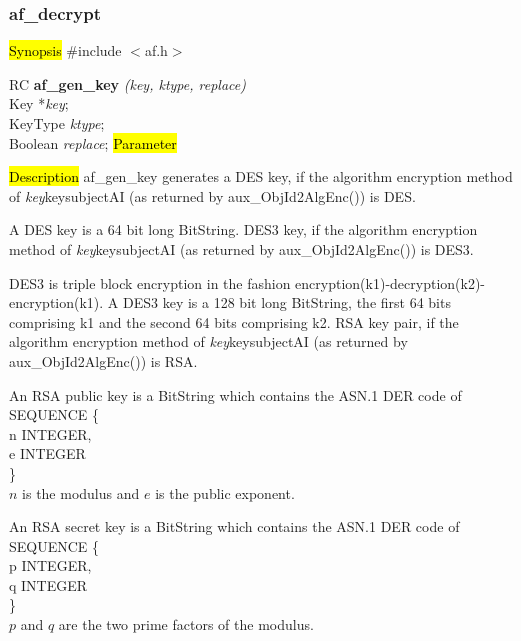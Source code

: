 \subsubsection{af\_decrypt}
\label{af_gen_key}
\hl{Synopsis}
\#include $<$af.h$>$

RC {\bf af\_gen\_key} {\em (key, ktype, replace)} \\
Key *{\em key}; \\
KeyType {\em ktype}; \\
Boolean {\em replace};
\hl{Parameter}



\hl{Description}
af\_gen\_key generates a
\bi
\m  DES key, 
    if the algorithm encryption method 
    of {\em key}\pf key\pf subjectAI (as returned by aux\_ObjId2AlgEnc()) is DES.
 
    A DES key is a 64 bit long BitString.
\m  DES3 key, 
    if the algorithm encryption method 
    of {\em key}\pf key\pf subjectAI (as returned by aux\_ObjId2AlgEnc()) is DES3.
 
    DES3 is triple block encryption in the fashion encryption(k1)-decryption(k2)-encryption(k1).
    A DES3 key is a 128 bit long BitString, the first 64 bits comprising k1 and the
    second 64 bits comprising k2.
\m  RSA key pair, 
    if the algorithm encryption method 
    of {\em key}\pf key\pf subjectAI (as returned by aux\_ObjId2AlgEnc()) is RSA. 

    An RSA public key is a BitString
    which contains the ASN.1 DER code of
    \bvtab
    \4  SEQUENCE \{ \\
    \4  \2       n INTEGER,   \\
    \4  \2       e INTEGER  \\
    \4  \} \\
    \evtab
    $n$ is the modulus and $e$ is the public exponent.
    

    An RSA secret key is a BitString
    which contains the ASN.1 DER code of
    \bvtab
    \4  SEQUENCE \{ \\
    \4  \2       p INTEGER,   \\
    \4  \2       q INTEGER  \\
    \4  \} \\
    \evtab
    $p$ and $q$ are the two prime factors of the modulus.

